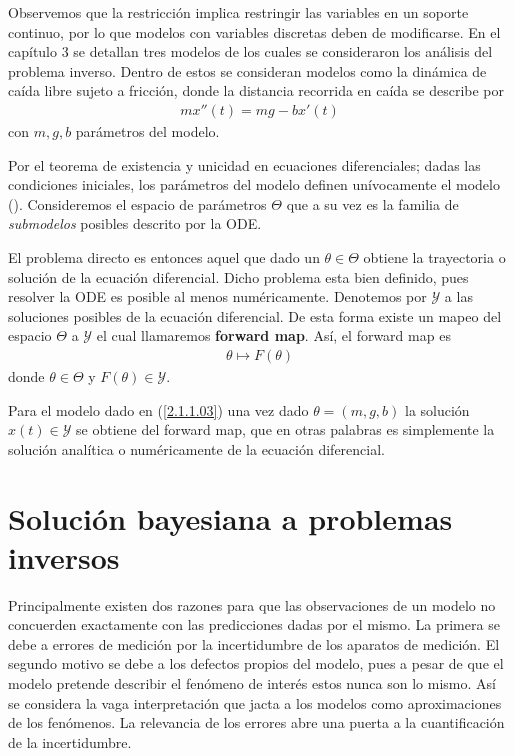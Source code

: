 Observemos que la restricción implica restringir las variables en un soporte continuo, por lo que modelos con variables discretas deben de modificarse. En el capítulo 3 se detallan tres modelos de los cuales se consideraron los análisis del problema inverso. Dentro de estos se consideran modelos como la dinámica de caída libre sujeto a fricción, donde la distancia recorrida en caída se describe por
\begin{align}
    mx''(t) = mg - bx'(t)
    \label{2.1.1.03}
\end{align}
con $m, g, b$ parámetros del modelo.

Por el teorema de existencia y unicidad en ecuaciones diferenciales; dadas las condiciones iniciales, los parámetros del modelo definen unívocamente el modelo (\cite{kelley2010theory}). Consideremos el espacio de parámetros $\Theta$ que a su vez es la familia de \textit{submodelos} posibles descrito por la ODE. 


El problema directo es entonces aquel que dado un $\theta \in \Theta$ obtiene la trayectoria o solución de la ecuación diferencial. Dicho problema esta bien definido, pues resolver la ODE es posible al menos numéricamente. Denotemos por $\mathcal{Y}$ a las soluciones posibles de la ecuación diferencial. De esta forma existe un mapeo del espacio $\Theta$ a $\mathcal{Y}$ el cual llamaremos \textbf{forward map}. Así, el forward map es 
\begin{align*}
    \theta \mapsto F(\theta) 
\end{align*}
donde $\theta \in \Theta$ y $F(\theta) \in \mathcal{Y}$.

Para el modelo dado en (\ref{2.1.1.03}) una vez dado $\theta = (m,g,b)$ la solución $x(t) \in \mathcal{Y}$ se obtiene del forward map, que en otras palabras es simplemente la solución analítica o numéricamente de la ecuación diferencial.

\section{Solución bayesiana a  problemas inversos}


Principalmente existen dos razones para que las observaciones de un modelo no concuerden exactamente con las predicciones dadas por el mismo. La primera se debe a errores de medición por la incertidumbre de los aparatos de medición. El segundo motivo se debe a los defectos propios del modelo, pues a pesar de que el modelo pretende describir el fenómeno de interés estos nunca son lo mismo. Así se considera la vaga interpretación que jacta a los modelos como aproximaciones de los fenómenos. La relevancia de los errores abre una puerta a la cuantificación de la incertidumbre.


